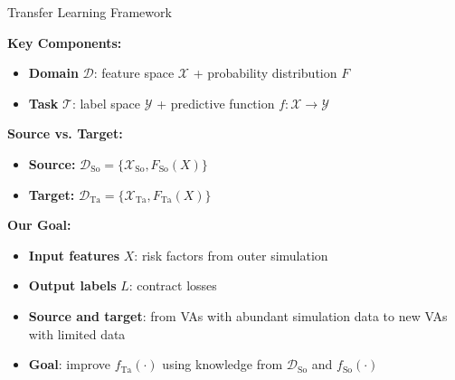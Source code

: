 \documentclass[9pt,handout]{beamer}
\begin{document}
\begin{frame}{Transfer Learning Framework}

    \textbf{Key Components:}
    \begin{itemize}
        \item   \textbf{Domain} $\mathcal{D}$: feature space $\mathcal{X}$ + probability distribution $F$
        \item   \textbf{Task} $\mathcal{T}$: label space $\mathcal{Y}$ + predictive function $f: \mathcal{X} \rightarrow \mathcal{Y}$
    \end{itemize}

    \vspace{10pt}
    \textbf{Source vs. Target:}
    \begin{itemize}
        \item   \textbf{Source:} $\mathcal{D}_{\text{So}} = \{\mathcal{X}_{\text{So}}, F_{\text{So}}(X)\}$
        \item   \textbf{Target:} $\mathcal{D}_{\text{Ta}} = \{\mathcal{X}_{\text{Ta}}, F_{\text{Ta}}(X)\}$
    \end{itemize}

    \vspace{10pt}
    \textbf{Our Goal:}
    \begin{itemize}
        \item   \textbf{Input features} $X$: risk factors from outer simulation
        \item   \textbf{Output labels} $L$: contract losses
        \item   \textbf{Source and target}: from VAs with abundant simulation data to new VAs with limited data
        \item   \textbf{Goal}: improve $f_{\text{Ta}}(\cdot)$ using knowledge from $\mathcal{D}_{\text{So}}$ and $f_{\text{So}}(\cdot)$
    \end{itemize}


\end{frame}
\end{document}
